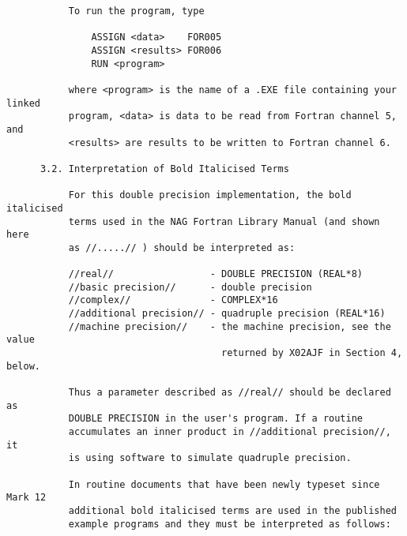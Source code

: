 \begin{small}
\begin{verbatim}
           To run the program, type                                             
                                                                                
               ASSIGN <data>    FOR005                                          
               ASSIGN <results> FOR006                                          
               RUN <program>                                                    
                                                                                
           where <program> is the name of a .EXE file containing your linked    
           program, <data> is data to be read from Fortran channel 5, and       
           <results> are results to be written to Fortran channel 6.            
                                                                                
      3.2. Interpretation of Bold Italicised Terms                              
                                                                                
           For this double precision implementation, the bold italicised        
           terms used in the NAG Fortran Library Manual (and shown here         
           as //.....// ) should be interpreted as:                             
                                                                                
           //real//                 - DOUBLE PRECISION (REAL*8)                 
           //basic precision//      - double precision                          
           //complex//              - COMPLEX*16                                
           //additional precision// - quadruple precision (REAL*16)             
           //machine precision//    - the machine precision, see the value      
                                      returned by X02AJF in Section 4, below.   
                                                                                
           Thus a parameter described as //real// should be declared as         
           DOUBLE PRECISION in the user's program. If a routine                 
           accumulates an inner product in //additional precision//, it         
           is using software to simulate quadruple precision.                   
                                                                                
           In routine documents that have been newly typeset since Mark 12      
           additional bold italicised terms are used in the published           
           example programs and they must be interpreted as follows:            
                                                                                

\end{verbatim}
\end{small}
